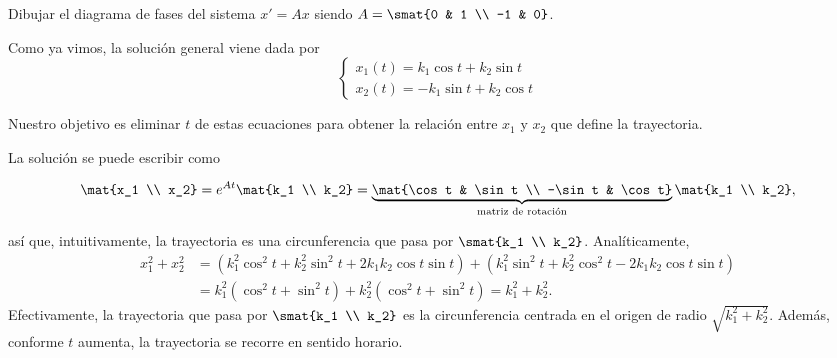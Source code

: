 \documentclass[../main.tex]{subfiles}
\begin{document}
\begin{example}
  Dibujar el diagrama de fases del sistema \(x' = Ax\) siendo
  \(A = \smat{0 & 1 \\ -1 & 0}\).

  Como ya vimos, la solución general viene dada por
  \[\begin{cases}
      x_1(t) = k_1 \cos t + k_2 \sin t \\
      x_2(t) = - k_1 \sin t + k_2 \cos t
    \end{cases}\]

  Nuestro objetivo es eliminar \(t\) de estas ecuaciones para obtener la
  relación entre \(x_1\) y \(x_2\) que define la trayectoria.

  La solución se puede escribir como

  \[\mat{x_1 \\ x_2} = e^{At}\mat{k_1 \\ k_2} =
    \underbrace{\mat{\cos t & \sin t \\ -\sin t & \cos t}}_{\text{matriz de
        rotación}} \mat{k_1 \\ k_2},\]

  así que, intuitivamente, la trayectoria es una circunferencia que pasa por
  \(\smat{k_1 \\ k_2}\). Analíticamente,
  \begin{align*}
    x_1^2 + x_2^2 &= (k_1^2\cos^2t + k_2^2\sin^2t + 2k_1k_2\cos t \sin t) +
                    (k_1^2\sin^2t + k_2^2\cos^2t - 2k_1k_2\cos t \sin t) \\
    &= k_1^2(\cos^2 t + \sin^2 t) + k_2^2(\cos^2t + \sin^2t) = k_1^2+k_2^2.
  \end{align*}
  Efectivamente, la trayectoria que pasa por \(\smat{k_1 \\ k_2}\) es la
  circunferencia centrada en el origen de radio \(\sqrt{k_1^2+k_2^2}\). Además,
  conforme \(t\) aumenta, la trayectoria se recorre en sentido horario.
  \begin{figure}[ht]
    \centering
  \end{figure}
\end{example}
\end{document}
